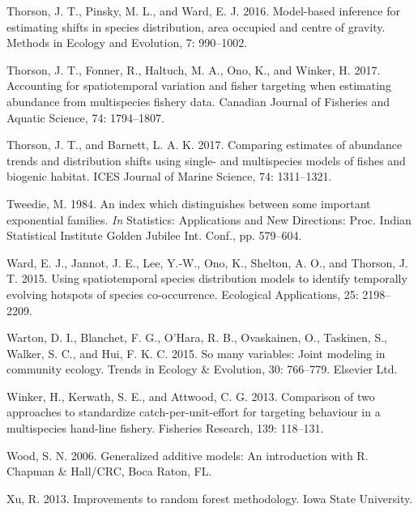 \documentclass[]{article}
\begin{document}
\leavevmode\hypertarget{ref-thorson2016}{}%
Thorson, J. T., Pinsky, M. L., and Ward, E. J. 2016. Model-based
inference for estimating shifts in species distribution, area occupied
and centre of gravity. Methods in Ecology and Evolution, 7: 990--1002.

\leavevmode\hypertarget{ref-thorson2017}{}%
Thorson, J. T., Fonner, R., Haltuch, M. A., Ono, K., and Winker, H.
2017. Accounting for spatiotemporal variation and fisher targeting when
estimating abundance from multispecies fishery data. Canadian Journal of
Fisheries and Aquatic Science, 74: 1794--1807.

\leavevmode\hypertarget{ref-thorson2017vast}{}%
Thorson, J. T., and Barnett, L. A. K. 2017. Comparing estimates of
abundance trends and distribution shifts using single- and multispecies
models of fishes and biogenic habitat. ICES Journal of Marine Science,
74: 1311--1321.

\leavevmode\hypertarget{ref-tweedie1984}{}%
Tweedie, M. 1984. An index which distinguishes between some important
exponential families. \emph{In} Statistics: Applications and New
Directions: Proc. Indian Statistical Institute Golden Jubilee Int.
Conf., pp. 579--604.

\leavevmode\hypertarget{ref-ward2015}{}%
Ward, E. J., Jannot, J. E., Lee, Y.-W., Ono, K., Shelton, A. O., and
Thorson, J. T. 2015. Using spatiotemporal species distribution models to
identify temporally evolving hotspots of species co-occurrence.
Ecological Applications, 25: 2198--2209.

\leavevmode\hypertarget{ref-warton2015}{}%
Warton, D. I., Blanchet, F. G., O'Hara, R. B., Ovaskainen, O., Taskinen,
S., Walker, S. C., and Hui, F. K. C. 2015. So many variables: Joint
modeling in community ecology. Trends in Ecology \& Evolution, 30:
766--779. Elsevier Ltd.

\leavevmode\hypertarget{ref-winker2013a}{}%
Winker, H., Kerwath, S. E., and Attwood, C. G. 2013. Comparison of two
approaches to standardize catch-per-unit-effort for targeting behaviour
in a multispecies hand-line fishery. Fisheries Research, 139: 118--131.

\leavevmode\hypertarget{ref-wood2006}{}%
Wood, S. N. 2006. Generalized additive models: An introduction with R.
Chapman \& Hall/CRC, Boca Raton, FL.

\leavevmode\hypertarget{ref-xu2013}{}%
Xu, R. 2013. Improvements to random forest methodology. Iowa State
University.

\pagebreak
\end{document}
